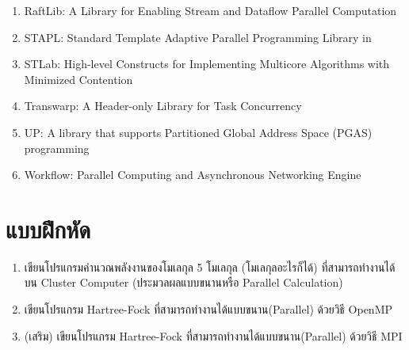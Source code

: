 \begin{enumerate}[topsep=0pt,noitemsep]
  \item RaftLib: A \cpp Library for Enabling Stream and Dataflow Parallel Computation

  \item STAPL: Standard Template Adaptive Parallel Programming Library in \cpp

  \item STLab: High-level Constructs for Implementing Multicore Algorithms with Minimized Contention

  \item Transwarp: A Header-only \cpp Library for Task Concurrency

  \item UP\cpp: A \cpp library that supports Partitioned Global Address Space (PGAS) programming

  \item Workflow: \cpp Parallel Computing and Asynchronous Networking Engine
\end{enumerate}


\section{แบบฝึกหัด}

\begin{enumerate}[topsep=0pt,noitemsep]
  \setlength\itemsep{0.5em}
  \item เขียนโปรแกรมคำนวณพลังงานของโมเลกุล 5 โมเลกุล (โมเลกุลอะไรก็ได้) ที่สามารถทำงานได้บน Cluster Computer (ประมวลผลแบบขนานหรือ Parallel Calculation)

  \item เขียนโปรแกรม Hartree-Fock ที่สามารถทำงานได้แบบขนาน(Parallel) ด้วยวิธี OpenMP

  \item (เสริม) เขียนโปรแกรม Hartree-Fock ที่สามารถทำงานได้แบบขนาน(Parallel) ด้วยวิธี MPI
\end{enumerate}